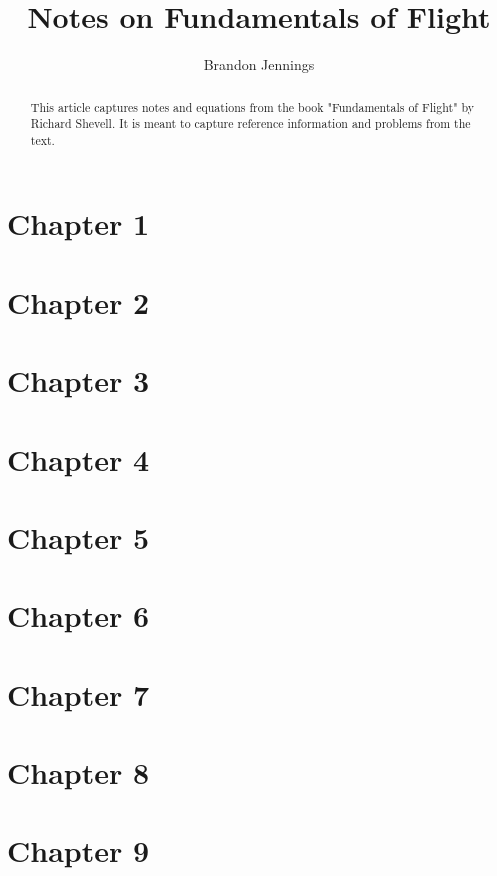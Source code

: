\documentclass[]{article}
\title{Notes on Fundamentals of Flight}
\author{Brandon Jennings}
\begin{document}
\maketitle

\begin{abstract}
This article captures notes and equations from the book "Fundamentals of Flight" by Richard Shevell. It is meant to capture reference information and problems from the text.
\end{abstract}

\section{Chapter 1}

\section{Chapter 2}

\section{Chapter 3}

\section{Chapter 4}

\section{Chapter 5}

\section{Chapter 6}

\section{Chapter 7}

\section{Chapter 8}

\section{Chapter 9}
\end{document}
